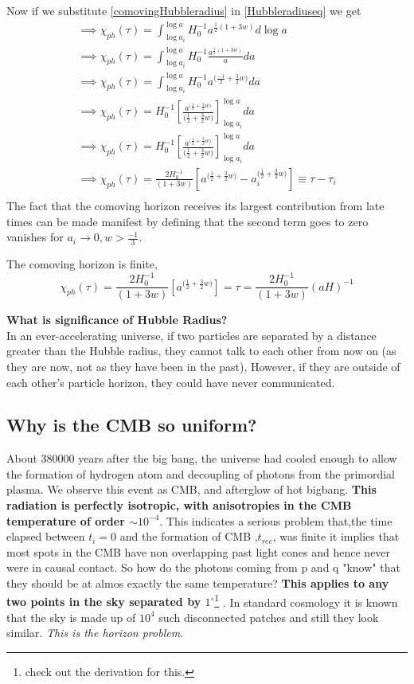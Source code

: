 \documentclass[12pt]{report}
\newcommand{\tbf}[1]{\textbf{#1}}
\newcommand{\tit}[1]{\textit{#1}}
\newcommand{\fn}[1]{\footnote{#1}}
\begin{document}
Now if we substitute \eqref{comovingHubbleradius} in \ref{Hubbleradiuseq} we get
\begin{eqnarray*}
\implies \chi_{ph} (\tau)= \int^{\log a}_{\log a_i}{H_0^{-1} a^{\frac{1}{2}(1+3w)} d \log a}\\
\implies \chi_{ph} (\tau)= \int^{\log a}_{\log a_i}{H_0^{-1} \frac{a^{\frac{1}{2}(1+3w)}}{a} da}\\
\implies \chi_{ph} (\tau)= \int^{\log a}_{\log a_i}{H_0^{-1} a^{({\frac{-1}{2}+\frac{3}{2}w)}} da}\\
\implies \chi_{ph} (\tau)= {H_0^{-1} \left[\frac{a^{({\frac{1}{2}+\frac{3}{2}w)}}}{({\frac{1}{2}+\frac{3}{2}w)}}\right]^{\log a}_{\log a_i} da}\\
\implies \chi_{ph} (\tau)= {H_0^{-1} \left[\frac{a^{({\frac{1}{2}+\frac{3}{2}w)}}}{({\frac{1}{2}+\frac{3}{2}w)}}\right]^{\log a}_{\log a_i} da}\\
\implies \chi_{ph} (\tau)=\frac{2H_0^{-1}}{(1+3w)} { \left[a^{({\frac{1}{2}+\frac{3}{2}w)}} - a_i^{({\frac{1}{2}+\frac{3}{2}w)}}\right] }\equiv \tau - \tau_i\\
\end{eqnarray*}
The fact that the comoving horizon receives its largest contribution from late times can be made manifest by defining that the second term goes to zero vanishes for $a_i \rightarrow 0 , w>\frac{-1}{3}$. 

The comoving horizon is finite,
\begin{equation}
\chi_{ph} (\tau)=\frac{2H_0^{-1}}{(1+3w)} { \left[a^{({\frac{1}{2}+\frac{3}{2}w)}} \right] } = \tau = \frac{2H_0^{-1}}{(1+3w)} (aH)^{-1}
\end{equation}

\tbf{What is significance of Hubble Radius?}\\
In an ever-accelerating universe, if two particles are separated by a distance greater than the Hubble radius, they cannot talk to each other from now on (as they are now, not as they have been in the past), However, if they are outside of each other's particle horizon, they could have never communicated.

\subsection{Why is the CMB so uniform?}
About 380000 years after the big bang, the universe had cooled enough to allow the formation of hydrogen atom and decoupling of photons from the primordial plasma. We observe this event as CMB, and afterglow of hot bigbang.
\tbf{This radiation is perfectly isotropic, with anisotropies in the CMB temperature of order $\sim 10^{-4}$}. This indicates a serious problem that,the time elapsed between $t_i=0$ and the formation of CMB ,$t_{rec}$, was finite it implies that most spots in the CMB have non overlapping past light cones and hence never were in causal contact. So how do the photons coming from p and q "know" that they should be at almos exactly the same temperature? \textbf{This applies to any two points in the sky separated by $1^{\circ}$}\fn{check out the derivation for this.} . In standard cosmology it is known that the sky is made up of $10^4$ such disconnected patches and still they look similar. \tit{This is the horizon problem.}
\end{document}

